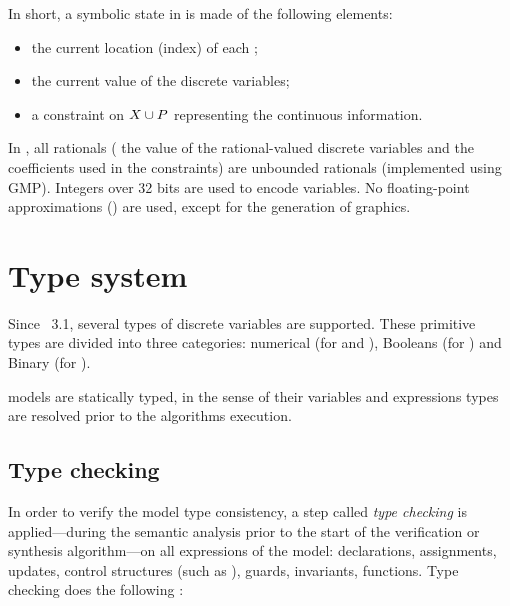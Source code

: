 
In short, a symbolic state in \imitator{} is made of the following elements:
\begin{itemize}
	\item the current location (index) of each \IPTA{};
	\item the current value of the discrete variables;
	\item a constraint on $X \cup P$ representing the continuous information.
\end{itemize}
In \imitator{}, all rationals (\ie{} the value of the rational-valued discrete variables and the coefficients used in the constraints) are unbounded rationals (implemented using GMP).
Integers over 32 bits are used to encode  variables.
No floating-point approximations () are used, except for the generation of graphics.


\section{Type system}\label{section:type_system}

Since \imitator{}~3.1, several types of discrete variables are supported.
%
These primitive types are divided into three categories: numerical (for  and ), Booleans (for ) and Binary (for ).

\imitator{} models are statically typed, in the sense of their variables and expressions types are resolved prior to the algorithms execution.


\subsection{Type checking}

In order to verify the model type consistency, a step called \emph{type checking} is applied---during the semantic analysis prior to the start of the verification or synthesis algorithm---on all expressions of the model: declarations, assignments, updates, control structures (such as ), guards, invariants, functions.
Type checking does the following :

